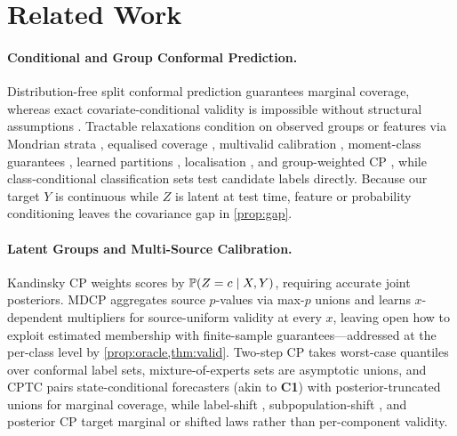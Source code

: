 \section{Related Work}
\label{sec:related}

\paragraph{Conditional and Group Conformal Prediction.}
Distribution-free split conformal prediction \citep{papadopoulos2002inductive,vovk2005algorithmic,angelopoulos2023gentle} guarantees marginal coverage, whereas exact covariate-conditional validity is impossible without structural assumptions \citep{vovk2012conditional,barber2021limits}.
Tractable relaxations condition on observed groups or features via Mondrian strata \citep{vovk2005algorithmic}, equalised coverage \citep{romano2020malice}, multivalid calibration \citep{jung2023batch}, moment-class guarantees \citep{gibbs2025conformal}, learned partitions \citep{kiyani2024conformal}, localisation \citep{guan2023localized}, and group-weighted CP \citep{bhattacharyya2024group}, while class-conditional classification sets \citep{sadinle2019least,ding2023class} test candidate labels directly.
Because our target $Y$ is continuous while $Z$ is latent at test time, feature or probability conditioning leaves the covariance gap in \cref{prop:gap}.

\paragraph{Latent Groups and Multi-Source Calibration.}
Kandinsky CP \citep{bairaktari2025kandinsky} weights scores by $\P(Z=c\mid X,Y)$, requiring accurate joint posteriors.
MDCP \citep{yang2026multi} aggregates source $p$-values via max-$p$ unions and learns $x$-dependent multipliers for source-uniform validity at every $x$, leaving open how to exploit estimated membership with finite-sample guarantees---addressed at the per-class level by \cref{prop:oracle,thm:valid}.
Two-step CP \citep{timans2024adaptive} takes worst-case quantiles over conformal label sets, mixture-of-experts sets \citep{javanmard2022prediction} are asymptotic unions, and CPTC \citep{sun2025conformal} pairs state-conditional forecasters (akin to \textbf{C1}) with posterior-truncated unions for marginal coverage, while label-shift \citep{podkopaev2021distribution}, subpopulation-shift \citep{wang2025conformal}, and posterior CP \citep{zhang2024posterior} target marginal or shifted laws rather than per-component validity.

